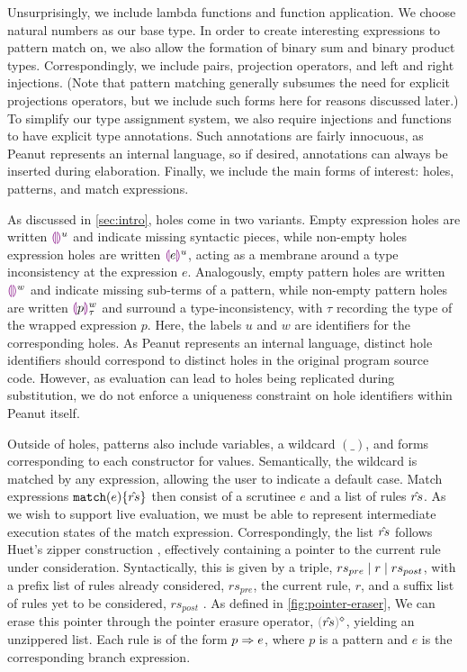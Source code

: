 Unsurprisingly, we include lambda functions and function application. We choose natural numbers as our base type. In order to create interesting expressions to pattern match on, we also allow the formation of binary sum and binary product types. Correspondingly, we include pairs, projection operators, and left and right injections. (Note that pattern matching generally subsumes the need for explicit projections operators, but we include such forms here for reasons discussed later.) To simplify our type assignment system, we also require injections and functions to have explicit type annotations. Such annotations are fairly innocuous, as Peanut represents an internal language, so if desired, annotations can always be inserted during elaboration. Finally, we include the main forms of interest: holes, patterns, and match expressions.

As discussed in \autoref{sec:intro}, holes come in two variants. Empty expression holes are written $\textcolor{violet}{\llparenthesis}\textcolor{violet}{\rrparenthesis}^{u}$ and indicate missing syntactic pieces, while non-empty holes expression holes are written $\textcolor{violet}{\llparenthesis} e\textcolor{violet}{\rrparenthesis}^{u}$, acting as a membrane around a type inconsistency at the expression $e$. Analogously, empty pattern holes are written $\textcolor{violet}{\llparenthesis}\textcolor{violet}{\rrparenthesis}^{w}$ and indicate missing sub-terms of a pattern, while non-empty pattern holes are written $\textcolor{violet}{\llparenthesis} p\textcolor{violet}{\rrparenthesis}^{w}_{\tau}$ and surround a type-inconsistency, with $\tau$ recording the type of the wrapped expression $p$. Here, the labels $u$ and $w$ are identifiers for the corresponding holes. As Peanut represents an internal language, distinct hole identifiers should correspond to distinct holes in the original program source code. However, as evaluation can lead to holes being replicated during substitution, we do not enforce a uniqueness constraint on hole identifiers within Peanut itself.

Outside of holes, patterns also include variables, a wildcard $(\_)$, and forms corresponding to each constructor for values. Semantically, the wildcard is matched by any expression, allowing the user to indicate a default case. Match expressions $\mathtt{match}(e) \{\hat{rs}\}$ then consist of a scrutinee $e$ and a list of rules $\hat{rs}$. As we wish to support live evaluation, we must be able to represent intermediate execution states of the match expression. Correspondingly, the list $\hat{rs}$ follows Huet's zipper construction \cite{DBLP:journals/jfp/Huet97}, effectively containing a pointer to the current rule under consideration. Syntactically, this is given by a triple, $rs_{pre} \mid r \mid rs_{post}$, with a prefix list of rules already considered, $rs_{pre}$, the current rule, $r$, and a suffix list of rules yet to be considered, $rs_{post}$ . As defined in \autoref{fig:pointer-eraser}, We can erase this pointer through the pointer erasure operator, $\rmpointer{\zrules}$, yielding an unzippered list. Each rule is of the form $p \Rightarrow e$, where $p$ is a pattern and $e$ is the corresponding branch expression. 

